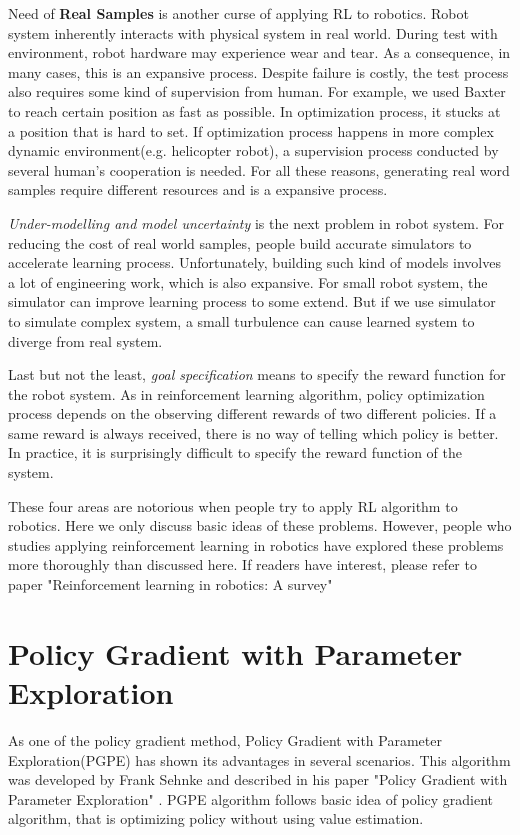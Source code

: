 \documentclass[officiallayout]{tktla}
\begin{document}
Need of \textbf{Real Samples} is another curse of applying RL to robotics. Robot system inherently interacts with physical system in real world. During test with environment, robot hardware may experience wear and tear. As a consequence, in many cases, this is an expansive process. Despite failure is costly, the test process also requires some kind of supervision from human. For example, we used Baxter to reach certain position as fast as possible. In optimization process, it stucks at a position that is hard to set. If optimization process happens in more complex dynamic environment(e.g. helicopter robot), a supervision process conducted by several human's cooperation is needed. For all these reasons, generating real word samples require different resources and is a expansive process.

\textit{Under-modelling and model uncertainty} is the next problem in robot system. For reducing the cost of real world samples, people build accurate simulators to accelerate learning process. Unfortunately, building such kind of models involves a lot of engineering work, which is also expansive. For small robot system, the simulator can improve learning process to some extend. But if we use simulator to simulate complex system, a small turbulence can cause learned system to diverge from real system.

Last but not the least, \textit{goal specification } means to specify the reward function for the robot system. As in reinforcement learning algorithm, policy optimization process depends on the observing different rewards of two different policies. If a same reward is always received, there is no way of telling which policy is better. In practice, it is surprisingly difficult to specify the reward function of the system. 

These four areas are notorious when people try to apply RL algorithm to robotics. Here we only discuss basic ideas of these problems. However, people who studies applying reinforcement learning in robotics have explored these problems more thoroughly than discussed here. If readers have interest, please refer to paper "Reinforcement learning in robotics: A survey"\cite{Kober2013}

\section{Policy Gradient with Parameter Exploration}
As one of the policy gradient method, Policy Gradient with Parameter Exploration(PGPE) has shown its advantages in several scenarios. This algorithm was developed by Frank Sehnke and described in his paper "Policy Gradient with Parameter Exploration" \cite{sehnke2008policy}. PGPE algorithm follows basic idea of policy gradient algorithm, that is optimizing policy without using value estimation.
\end{document}
